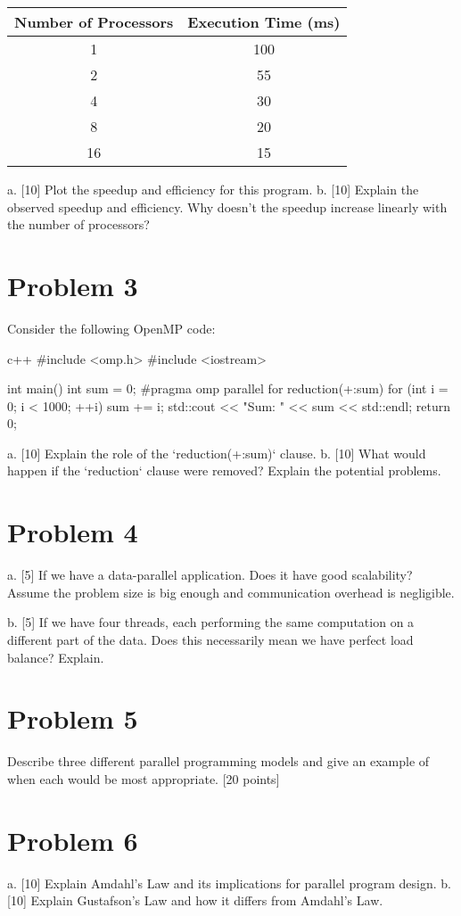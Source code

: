 \documentclass{article}
\begin{document}
\begin{tabular}{|c|c|}
\hline
Number of Processors & Execution Time (ms) \\
\hline
1 & 100 \\
2 & 55 \\
4 & 30 \\
8 & 20 \\
16 & 15 \\
\hline
\end{tabular}

a. [10] Plot the speedup and efficiency for this program.
b. [10] Explain the observed speedup and efficiency. Why doesn't the speedup increase linearly with the number of processors?


\section*{Problem 3}
Consider the following OpenMP code:

c++
#include <omp.h>
#include <iostream>

int main() {
  int sum = 0;
  #pragma omp parallel for reduction(+:sum)
  for (int i = 0; i < 1000; ++i) {
    sum += i;
  }
  std::cout << "Sum: " << sum << std::endl;
  return 0;
}

a. [10] Explain the role of the `reduction(+:sum)` clause.
b. [10] What would happen if the `reduction` clause were removed?  Explain the potential problems.


\section*{Problem 4}
a. [5]  If we have a data-parallel application. Does it have good scalability? Assume the problem size is big enough and communication overhead is negligible.

b. [5] If we have four threads, each performing the same computation on a different part of the data. Does this necessarily mean we have perfect load balance? Explain.


\section*{Problem 5}
Describe three different parallel programming models and give an example of when each would be most appropriate.  [20 points]


\section*{Problem 6}
a. [10] Explain Amdahl's Law and its implications for parallel program design.
b. [10] Explain Gustafson's Law and how it differs from Amdahl's Law.
\end{document}
